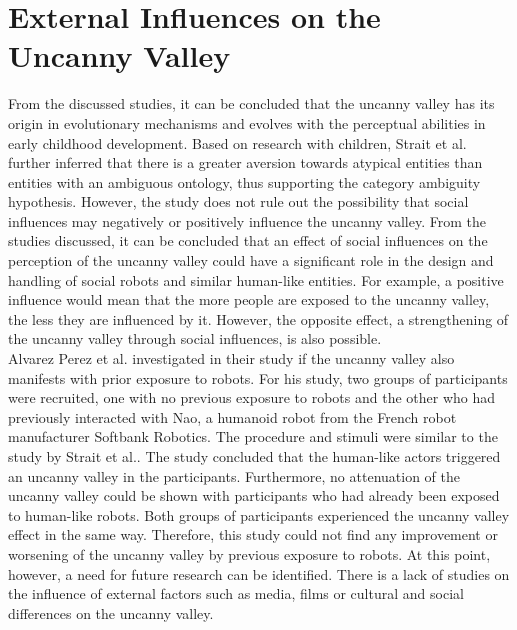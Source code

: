 \section{External Influences on the Uncanny Valley}
From the discussed studies, it can be concluded that the uncanny valley has its origin in evolutionary mechanisms and evolves with the perceptual abilities in early childhood development. Based on research with children, Strait et al. \cite{childrens_responding} further inferred that there is a greater aversion towards atypical entities than entities with an ambiguous ontology, thus supporting the category ambiguity hypothesis. However, the study does not rule out the possibility that social influences may negatively or positively influence the uncanny valley. From the studies discussed, it can be concluded that an effect of social influences on the perception of the uncanny valley could have a significant role in the design and handling of social robots and similar human-like entities. For example, a positive influence would mean that the more people are exposed to the uncanny valley, the less they are influenced by it. However, the opposite effect, a strengthening of the uncanny valley through social influences, is also possible.\\
Alvarez Perez et al. \cite{prior_exposure_robots} investigated in their study if the uncanny valley also manifests with prior exposure to robots. For his study, two groups of participants were recruited, one with no previous exposure to robots and the other who had previously interacted with Nao, a humanoid robot from the French robot manufacturer Softbank Robotics. The procedure and stimuli were similar to the study by Strait et al.. The study concluded that the human-like actors triggered an uncanny valley in the participants. Furthermore, no attenuation of the uncanny valley could be shown with participants who had already been exposed to human-like robots. Both groups of participants experienced the uncanny valley effect in the same way. Therefore, this study could not find any improvement or worsening of the uncanny valley by previous exposure to robots. At this point, however, a need for future research can be identified. There is a lack of studies on the influence of external factors such as media, films or cultural and social differences on the uncanny valley.